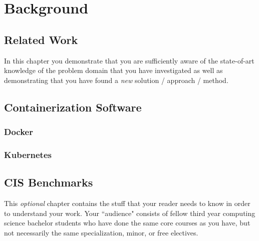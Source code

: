 \chapter{Background}

\section{Related Work}
In this chapter you demonstrate that you are sufficiently aware of the
state-of-art knowledge of the problem domain that you have investigated as
well as demonstrating that you have found a \emph{new} solution / approach / method.

\section{Containerization Software}
\subsection{Docker}
\subsection{Kubernetes}
\section{CIS Benchmarks}

This \emph{optional} chapter contains the stuff that your reader needs to know in order to understand
your work.
Your ``audience" consists of fellow third year computing science bachelor students who have done the same
core courses as you have, but not necessarily the same specialization, minor, or free electives.
